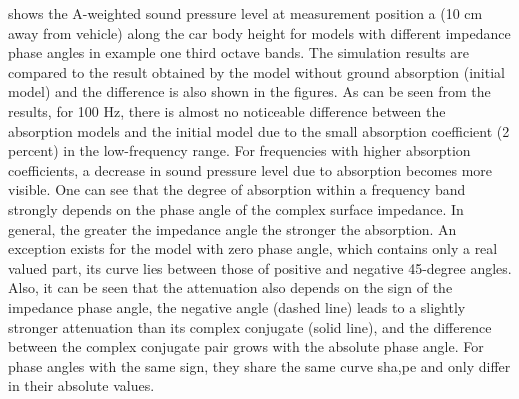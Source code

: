 \noindent {} shows the A-weighted sound pressure level at measurement position a (10 cm away from vehicle) along the car body height for models with different impedance phase angles in example one third octave bands. The simulation results are compared to the result obtained by the model without ground absorption (initial model) and the difference is also shown in the figures. %
As can be seen from the results, for 100 Hz, there is almost no noticeable difference between the absorption models and the initial model due to the small absorption coefficient (2 percent) in the low-frequency range. For frequencies with higher absorption coefficients, a decrease in sound pressure level due to absorption becomes more visible. One can see that the degree of absorption within a frequency band strongly depends on the phase angle of the complex surface impedance. In general, the greater the impedance angle the stronger the absorption. An exception exists for the model with zero phase angle, which contains only a real valued part, its curve lies between those of positive and negative 45-degree angles. Also, it can be seen that the attenuation also depends on the sign of the impedance phase angle, the negative angle (dashed line) leads to a slightly stronger attenuation than its complex conjugate (solid line), and the difference between the complex conjugate pair grows with the absolute phase angle. For phase angles with the same sign, they share the same curve sha,pe and only differ in their absolute values.

